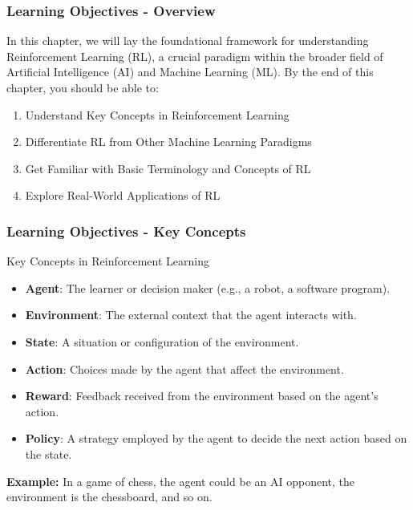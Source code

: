 \documentclass[aspectratio=169]{beamer}
\begin{document}
\begin{frame}[fragile]
    \frametitle{Learning Objectives - Overview}
    In this chapter, we will lay the foundational framework for understanding Reinforcement Learning (RL), a crucial paradigm within the broader field of Artificial Intelligence (AI) and Machine Learning (ML). By the end of this chapter, you should be able to:
    \begin{enumerate}
        \item Understand Key Concepts in Reinforcement Learning
        \item Differentiate RL from Other Machine Learning Paradigms
        \item Get Familiar with Basic Terminology and Concepts of RL
        \item Explore Real-World Applications of RL
    \end{enumerate}
\end{frame}

\begin{frame}[fragile]
    \frametitle{Learning Objectives - Key Concepts}
    \begin{block}{Key Concepts in Reinforcement Learning}
        \begin{itemize}
            \item \textbf{Agent}: The learner or decision maker (e.g., a robot, a software program).
            \item \textbf{Environment}: The external context that the agent interacts with.
            \item \textbf{State}: A situation or configuration of the environment.
            \item \textbf{Action}: Choices made by the agent that affect the environment.
            \item \textbf{Reward}: Feedback received from the environment based on the agent's action.
            \item \textbf{Policy}: A strategy employed by the agent to decide the next action based on the state.
        \end{itemize}
    \end{block}
  
    \textbf{Example:} In a game of chess, the agent could be an AI opponent, the environment is the chessboard, and so on.
\end{frame}
\end{document}
